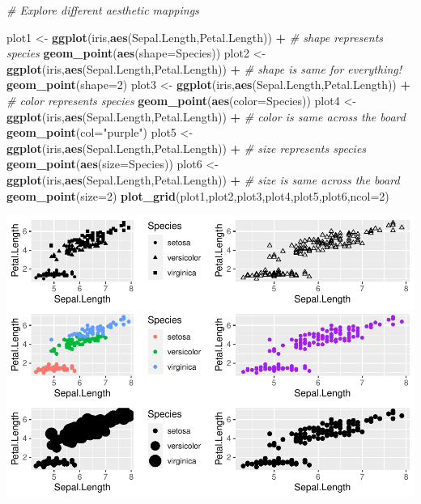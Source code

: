 \documentclass[
]{article}
\newenvironment{Shaded}{\begin{snugshade}}{\end{snugshade}}
\newcommand{\AttributeTok}[1]{\textcolor[rgb]{0.13,0.29,0.53}{#1}}
\newcommand{\CommentTok}[1]{\textcolor[rgb]{0.56,0.35,0.01}{\textit{#1}}}
\newcommand{\DecValTok}[1]{\textcolor[rgb]{0.00,0.00,0.81}{#1}}
\newcommand{\FunctionTok}[1]{\textcolor[rgb]{0.13,0.29,0.53}{\textbf{#1}}}
\newcommand{\NormalTok}[1]{#1}
\newcommand{\OtherTok}[1]{\textcolor[rgb]{0.56,0.35,0.01}{#1}}
\newcommand{\SpecialCharTok}[1]{\textcolor[rgb]{0.81,0.36,0.00}{\textbf{#1}}}
\newcommand{\StringTok}[1]{\textcolor[rgb]{0.31,0.60,0.02}{#1}}
\begin{document}
\begin{Shaded}
\begin{Highlighting}[]
\CommentTok{\# Explore different aesthetic mappings }

\NormalTok{plot1 }\OtherTok{\textless{}{-}} \FunctionTok{ggplot}\NormalTok{(iris,}\FunctionTok{aes}\NormalTok{(Sepal.Length,Petal.Length)) }\SpecialCharTok{+}    \CommentTok{\# shape represents species}
  \FunctionTok{geom\_point}\NormalTok{(}\FunctionTok{aes}\NormalTok{(}\AttributeTok{shape=}\NormalTok{Species))}
\NormalTok{plot2 }\OtherTok{\textless{}{-}} \FunctionTok{ggplot}\NormalTok{(iris,}\FunctionTok{aes}\NormalTok{(Sepal.Length,Petal.Length)) }\SpecialCharTok{+}       \CommentTok{\# shape is same for everything!}
  \FunctionTok{geom\_point}\NormalTok{(}\AttributeTok{shape=}\DecValTok{2}\NormalTok{)}
\NormalTok{plot3 }\OtherTok{\textless{}{-}} \FunctionTok{ggplot}\NormalTok{(iris,}\FunctionTok{aes}\NormalTok{(Sepal.Length,Petal.Length)) }\SpecialCharTok{+}    \CommentTok{\# color represents species}
  \FunctionTok{geom\_point}\NormalTok{(}\FunctionTok{aes}\NormalTok{(}\AttributeTok{color=}\NormalTok{Species)) }
\NormalTok{plot4 }\OtherTok{\textless{}{-}} \FunctionTok{ggplot}\NormalTok{(iris,}\FunctionTok{aes}\NormalTok{(Sepal.Length,Petal.Length)) }\SpecialCharTok{+}    \CommentTok{\# color is same across the board}
  \FunctionTok{geom\_point}\NormalTok{(}\AttributeTok{col=}\StringTok{"purple"}\NormalTok{)  }
\NormalTok{plot5 }\OtherTok{\textless{}{-}} \FunctionTok{ggplot}\NormalTok{(iris,}\FunctionTok{aes}\NormalTok{(Sepal.Length,Petal.Length)) }\SpecialCharTok{+}    \CommentTok{\# size represents species}
  \FunctionTok{geom\_point}\NormalTok{(}\FunctionTok{aes}\NormalTok{(}\AttributeTok{size=}\NormalTok{Species)) }
\NormalTok{plot6 }\OtherTok{\textless{}{-}} \FunctionTok{ggplot}\NormalTok{(iris,}\FunctionTok{aes}\NormalTok{(Sepal.Length,Petal.Length)) }\SpecialCharTok{+}    \CommentTok{\# size is same across the board}
  \FunctionTok{geom\_point}\NormalTok{(}\AttributeTok{size=}\DecValTok{2}\NormalTok{) }
\FunctionTok{plot\_grid}\NormalTok{(plot1,plot2,plot3,plot4,plot5,plot6,}\AttributeTok{ncol=}\DecValTok{2}\NormalTok{)}
\end{Highlighting}
\end{Shaded}

\includegraphics{module1_3_files/figure-latex/unnamed-chunk-11-1.pdf}
\end{document}
